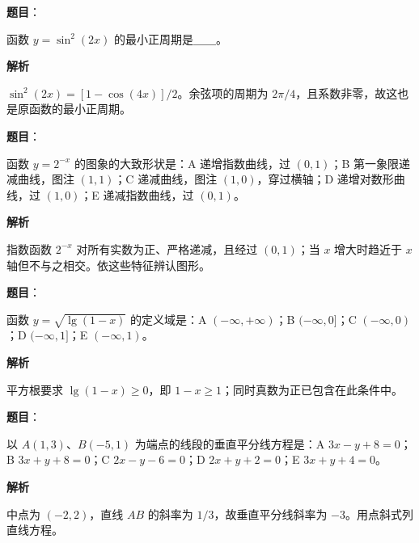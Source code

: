 \begin{answer}

\textbf{题目}：

函数 $y=\sin^2(2x)$ 的最小正周期是＿＿。

\textbf{解析}

$\sin^2(2x)=[1-\cos(4x)]/2$。余弦项的周期为 $2\pi/4$，且系数非零，故这也是原函数的最小正周期。


\end{answer}
\begin{answer}

\textbf{题目}：

函数 $y=2^{-x}$ 的图象的大致形状是：A 递增指数曲线，过 $(0,1)$；B 第一象限递减曲线，图注 $(1,1)$；C 递减曲线，图注 $(1,0)$，穿过横轴；D 递增对数形曲线，过 $(1,0)$；E 递减指数曲线，过 $(0,1)$。
\nopagebreak[4]
\begin{center}\end{center}
\nopagebreak[4]
\textbf{解析}

指数函数 $2^{-x}$ 对所有实数为正、严格递减，且经过 $(0,1)$；当 $x$ 增大时趋近于 $x$ 轴但不与之相交。依这些特征辨认图形。


\end{answer}
\begin{answer}

\textbf{题目}：

函数 $y=\sqrt{\lg(1-x)}$ 的定义域是：A $(-\infty,+\infty)$；B $(-\infty,0]$；C $(-\infty,0)$；D $(-\infty,1]$；E $(-\infty,1)$。

\textbf{解析}

平方根要求 $\lg(1-x)\ge0$，即 $1-x\ge1$；同时真数为正已包含在此条件中。


\end{answer}
\begin{answer}

\textbf{题目}：

以 $A(1,3)$、$B(-5,1)$ 为端点的线段的垂直平分线方程是：A $3x-y+8=0$；B $3x+y+8=0$；C $2x-y-6=0$；D $2x+y+2=0$；E $3x+y+4=0$。

\textbf{解析}

中点为 $(-2,2)$，直线 $AB$ 的斜率为 $1/3$，故垂直平分线斜率为 $-3$。用点斜式列直线方程。


\end{answer}
